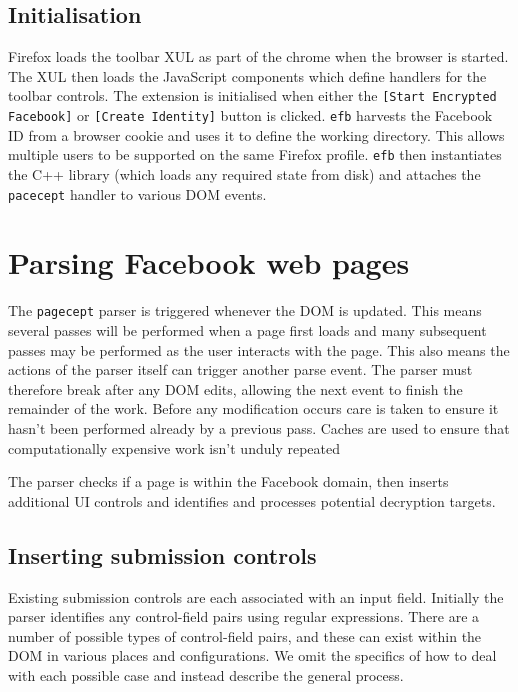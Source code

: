     
\FloatBarrier    
\subsection{Initialisation}

Firefox loads the toolbar XUL as part of the chrome when the browser is started. The XUL then loads the JavaScript components which define handlers for the toolbar controls. The extension is initialised when either the {\tt [Start Encrypted Facebook]} or {\tt [Create Identity]} button is clicked. {\tt efb} harvests the Facebook ID from a browser cookie and uses it to define the working directory. This allows multiple users to be supported on the same Firefox profile. {\tt efb} then instantiates the C++ library (which loads any required state from disk) and attaches the {\tt pacecept} handler to various DOM events.


\FloatBarrier
\section{Parsing Facebook web pages}
\label{sec:parsing}

The {\tt pagecept} parser is triggered whenever the DOM is updated. This means several passes will be performed when a page first loads and many subsequent passes may be performed as the user interacts with the page. This also means the actions of the parser itself can trigger another parse event. The parser must therefore break after any DOM edits, allowing the next event to finish the remainder of the work. Before any modification occurs care is taken to ensure it hasn't been performed already by a previous pass. Caches are used to ensure that computationally expensive work isn't unduly repeated

The parser checks if a page is within the Facebook domain, then inserts additional UI controls and identifies and processes potential decryption targets.

\subsection{Inserting submission controls}
\label{ssec:insert}

Existing submission controls are each associated with an input field. Initially the parser identifies any control-field pairs using regular expressions. There are a number of possible types of control-field pairs, and these can exist within the DOM in various places and configurations. We omit the specifics of how to deal with each possible case and instead describe the general process.

